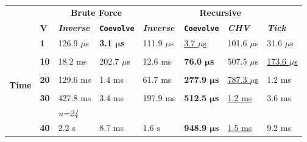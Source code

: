 \documentclass{juliacon}
\numberwithin{equation}{section}
\begin{document}
\begin{table}
\centering
\begin{tabular}{clllllll} 
\toprule
\multicolumn{1}{l}{} &  & \multicolumn{2}{c}{\textbf{Brute Force }} & \multicolumn{4}{c}{\textbf{Recursive}} \\
\multicolumn{1}{l}{} & \textbf{V} & \textbf{\textit{Inverse}} & \textbf{\texttt{Coevolve}} & \textbf{\textit{Inverse}} & \textbf{\texttt{Coevolve}} & \textbf{\textit{CHV}} & \textbf{\textit{Tick}} \\ 
\hline
\multirow{20}{*}{\textbf{Time}} & \textbf{1}  & 126.9 \( \mu \)s  & \textbf{3.1 \( \bm{\mu} \)s} & 111.9 \( \mu \)s & \underline{3.7 \( \mu \)s}     & 101.6 \( \mu \)s             & 31.6 \( \mu \)s              \\
                                &             &                   &                              &                  &                                &                              &                              \\
                                & \textbf{10} & 18.2 ms           & 202.7 \( \mu \)s             & 12.6 ms          & \textbf{76.0 \( \bm{\mu} \)s}  & 507.5 \( \mu \)s             & \underline{173.6 \( \mu \)s} \\
                                &             &                   &                              &                  &                                &                              &                              \\
                                & \textbf{20} & 129.6 ms          & 1.4 ms                       & 61.7 ms          & \textbf{277.9 \( \bm{\mu} \)s} & \underline{787.3 \( \mu \)s} & 1.2 ms                       \\
                                &             &                   &                              &                  &                                &                              &                              \\
                                & \textbf{30} & 427.8 ms          & 3.4 ms                       & 197.9 ms         & \textbf{512.5 \( \bm{\mu} \)s} & \underline{1.2 ms}           & 3.6 ms                       \\
                                &             & \textit{n=24}     &                              &                  &                                &                              &                              \\
                                & \textbf{40} & 2.2 s             & 8.7 ms                       & 1.6 s            & \textbf{948.9 \( \bm{\mu} \)s} & \underline{1.5 ms}           & 9.2 ms                       \\

\end{tabular}
\end{table}
\end{document}
